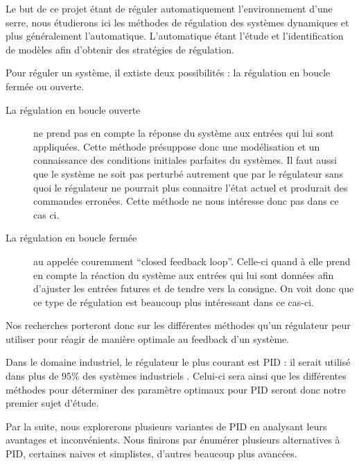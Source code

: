
Le but de ce projet étant de réguler automatiquement l'environnement d'une serre, nous étudierons ici les méthodes de régulation des systèmes dynamiques et plus généralement l'automatique.
L'automatique étant l'étude et l'identification de modèles afin d'obtenir des stratégies de régulation.

Pour réguler un système, il extiste deux possibilités : la régulation en boucle fermée ou ouverte.

\begin{description}
\item[La régulation en boucle ouverte] ne prend pas en compte la réponse du système aux entrées qui lui sont appliquées. Cette méthode présuppose donc une modélisation et un connaissance  des conditions initiales parfaites du systèmes. Il faut aussi que le système ne soit pas perturbé autrement que par le régulateur sans quoi le régulateur ne pourrait plus connaitre l'état actuel et produrait des commandes erronées. Cette méthode ne nous intéresse donc pas dans ce cas ci.

\item[La régulation en boucle fermée] au appelée couremment ``closed feedback loop''. Celle-ci quand à elle prend en compte la réaction du système aux entrées qui lui sont données afin d'ajuster les entrées futures et de tendre vers la consigne. On voit donc que ce type de régulation est beaucoup plus intéressant dans ce cas-ci.
\end{description}

Nos recherches porteront donc sur les différentes méthodes qu'un régulateur peur utiliser pour réagir de manière optimale au feedback d'un système.


Dans le domaine industriel, le régulateur le plus courant est PID : il serait utilisé dans plus de 95\% des systèmes industriels \cite{Kinnaert2013}. Celui-ci sera ainsi que les différentes méthodes pour déterminer des paramètre optimaux pour PID seront donc notre premier sujet d'étude.

Par la suite, nous explorerons plusieurs variantes de PID en analysant leurs avantages et inconvénients. Nous finirons par énumérer plusieurs alternatives à PID, certaines naives et simplistes, d'autres beaucoup plus avancées.
